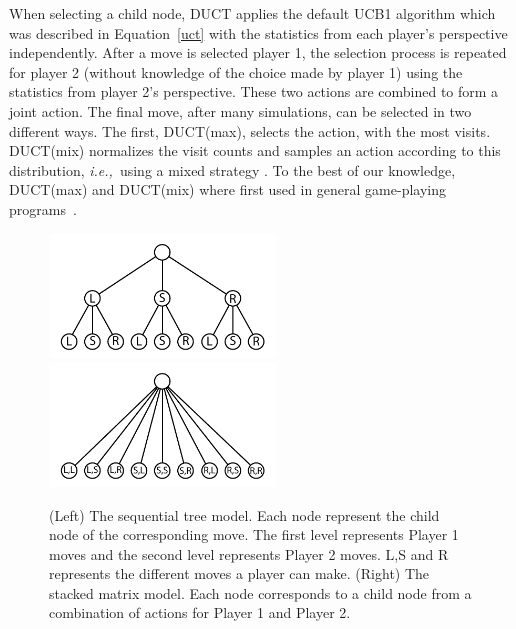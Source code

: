 \documentclass{article}
\newcommand{\ie}{{\it i.e.,}~}
\begin{document}
When selecting a child node, DUCT applies the default UCB1 algorithm which was described in Equation~\ref{uct} with the statistics from each player's perspective independently. After a move is selected player 1, the selection process is repeated for player 2 (without knowledge of the choice made by player 1) using the statistics from player 2's perspective. These two actions are combined to form a joint action.
The final move, after many simulations, can be selected in two different ways. The first, DUCT(max), selects the action, with the most visits. 
DUCT(mix) normalizes the visit counts and samples an action according to this distribution, \ie using a mixed strategy \cite{mcts_goofspiel}. 
To the best of our knowledge, DUCT(max) and DUCT(mix) where first used in general game-playing programs~\cite{finnson_master,Shafiei09}.

\begin{figure}
\begin{center}
\includegraphics[width=6cm]{images/graph_seq_uct.pdf}~~~~\includegraphics[width=6cm]{images/graph_dec_uct.pdf}
\caption{(Left) The sequential tree model. Each node represent the child node of the corresponding move. The first level represents Player 1 moves and the second level represents Player 2 moves. 
L,S and R represents the different moves a player can make. 
(Right) The stacked matrix model. Each node corresponds to a child node from a combination of actions for Player 1 and Player 2. 
\label{fig:suct_vs_duct}}
\end{center}
\end{figure}
\end{document}
